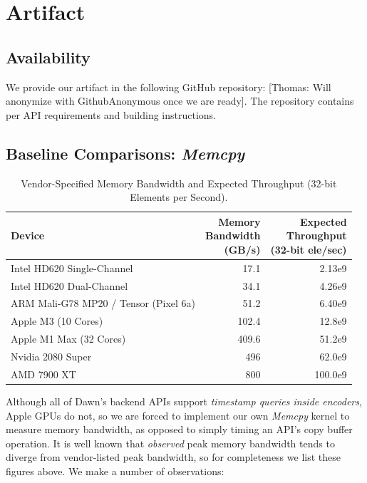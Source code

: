 \documentclass[acmsmall, manuscript, screen, review, anonymous]{acmart}
\newcommand{\thomas}[1]{{\footnotesize\color{orange}[Thomas: #1]}}
\begin{document}
\clearpage
\appendix
\section{Artifact}
\subsection{Availability}
We provide our artifact in the following GitHub repository: \thomas{Will anonymize with GithubAnonymous once we are ready}. The repository contains per API requirements and building instructions.

\subsection{Baseline Comparisons: \emph{Memcpy}}%
\label{sec:memcpy}
\begin{table}
  \small
  \centering
  \begin{tabular}{l r r}
    \toprule
    Device                                & \makecell{Memory           \\ Bandwidth \\ (GB/s)} & \makecell{Expected \\ Throughput \\ (32-bit ele/sec)} \\
    \midrule
    Intel HD620 Single-Channel            & 17.1             & 2.13e9  \\
    Intel HD620 Dual-Channel              & 34.1             & 4.26e9  \\
    ARM Mali-G78 MP20 / Tensor (Pixel 6a) & 51.2             & 6.40e9  \\
    Apple M3 (10 Cores)                   & 102.4            & 12.8e9  \\
    Apple M1 Max (32 Cores)               & 409.6            & 51.2e9  \\
    Nvidia 2080 Super                     & 496              & 62.0e9  \\
    AMD 7900 XT                           & 800              & 100.0e9 \\
    \bottomrule
  \end{tabular}
  \caption{Vendor-Specified Memory Bandwidth and Expected Throughput (32-bit Elements per Second).\label{tab:memory_bandwidth}}
\end{table}
Although all of Dawn's backend APIs support \emph{timestamp queries inside encoders}, Apple GPUs do not, so we are forced to implement our own \emph{Memcpy} kernel to measure memory bandwidth, as opposed to simply timing an API's copy buffer operation. It is well known that \emph{observed} peak memory bandwidth tends to diverge from vendor-listed peak bandwidth, so for completeness we list these figures above. We make a number of observations:
\end{document}
